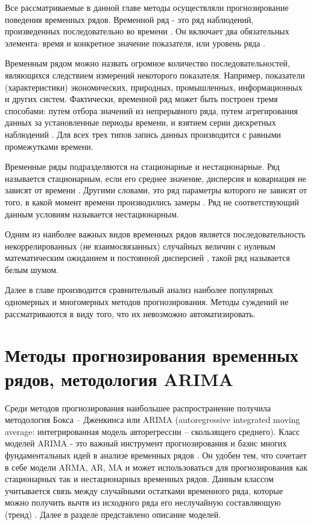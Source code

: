 \documentclass[a4paper,14pt,russian]{extreport}
\begin{document}
Все рассматриваемые в данной главе методы осуществляли прогнозирование 
поведения временных рядов. Временной ряд - это ряд наблюдений, 
произведенных последовательно во времени \cite{chatfield2000, armstrong1999, 
brockwell2002, box2008, wolters2007, hyndman2012}. Он включает два 
обязательных элемента: время и конкретное значение показателя, или уровень 
ряда \cite{popov2006, afanasyev2001}. 

Временным рядом можно назвать огромное количество последовательностей, 
являющихся следствием измерений некоторого показателя. Например, 
показатели (характеристики) экономических, природных, промышленных, 
информационных и других систем. Фактически, временной ряд может быть 
построен тремя способами: путем отбора значений из непрерывного ряда, путем 
агрегирования данных за установленные периоды времени, и взятием серии 
дискретных наблюдений \cite{chatfield2000, box2008}. Для всех трех типов запись 
данных производится с равными промежутками времени.

Временные ряды подразделяются на стационарные и нестационарные. Ряд 
называется стационарным, если его среднее значение, дисперсия и ковариация 
не зависят от времени \cite{popov2006}. Другими словами, это ряд параметры 
которого не зависят от того, в какой момент времени производились замеры 
\cite{hyndman2012}. Ряд не соответствующий данным условиям называется 
нестационарным.

Одним из наиболее важных видов временных рядов является 
последовательность некоррелированных (не взаимосвязанных) случайных 
величин с нулевым математическим ожиданием и постоянной дисперсией 
\cite{fuller1996, runova2013}, такой ряд называется белым шумом.

Далее в главе производится сравнительный анализ наиболее популярных 
одномерных и многомерных методов прогнозирования. Методы суждений не 
рассматриваются в виду того, что их невозможно автоматизировать.

\section{Методы прогнозирования временных рядов, методология ARIMA} 
Среди методов прогнозирования наибольшее распространение получила 
методология Бокса -- Дженкинса или ARIMA (autoregressive integrated moving 
average: интегрированная модель авторегрессии -- скользящего среднего). Класс 
моделей ARIMA - это важный инструмент прогнозирования и базис многих 
фундаментальных идей в анализе временных рядов \cite{chatfield2000}. Он 
удобен тем, что сочетает в себе модели ARMA, AR, MA и может использоваться 
для прогнозирования как стационарных так и нестационарных временных рядов. 
Данным классом учитывается связь между случайными остатками временного 
ряда, которые можно получить вычтя из исходного ряда его неслучайную 
составляющую (тренд) \cite{tihonov2006}. Далее в разделе представлено описание 
моделей.
\end{document}
